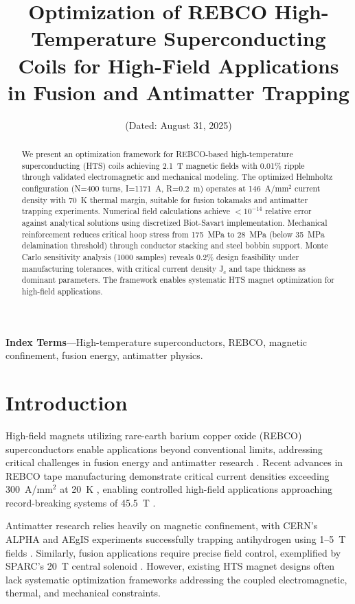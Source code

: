 \documentclass[10pt,twocolumn]{article}
\title{\Large\bfseries Optimization of REBCO High-Temperature Superconducting Coils for High-Field Applications in Fusion and Antimatter Trapping}
\author{\authorname}
\affil{Independent Researcher\thanks{Electronic address: \texttt{\authoremail}.}}
\date{(Dated: August 31, 2025)}
\begin{document}
\makeatletter
\renewcommand\@makefntext[1]{%
  \noindent\makebox[1.8em][l]{\@makefnmark}#1%
}
\makeatother

\maketitle

\begin{abstract}
We present an optimization framework for REBCO-based high-temperature superconducting (HTS) coils achieving 2.1~T magnetic fields with 0.01\% ripple through validated electromagnetic and mechanical modeling. The optimized Helmholtz configuration (N=400 turns, I=1171~A, R=0.2~m) operates at 146~A/mm$^2$ current density with 70~K thermal margin, suitable for fusion tokamaks and antimatter trapping experiments. Numerical field calculations achieve $<10^{-14}$ relative error against analytical solutions using discretized Biot-Savart implementation. Mechanical reinforcement reduces critical hoop stress from 175~MPa to 28~MPa (below 35~MPa delamination threshold) through conductor stacking and steel bobbin support. Monte Carlo sensitivity analysis (1000 samples) reveals 0.2\% design feasibility under manufacturing tolerances, with critical current density J$_c$ and tape thickness as dominant parameters. The framework enables systematic HTS magnet optimization for high-field applications.
\end{abstract}

\textbf{Index Terms}---High-temperature superconductors, REBCO, magnetic confinement, fusion energy, antimatter physics.

\section{Introduction}

High-field magnets utilizing rare-earth barium copper oxide (REBCO) superconductors enable applications beyond conventional limits, addressing critical challenges in fusion energy and antimatter research \cite{zhou2023}. Recent advances in REBCO tape manufacturing demonstrate critical current densities exceeding 300~A/mm$^2$ at 20~K \cite{superpower2022}, enabling controlled high-field applications approaching record-breaking systems of 45.5~T \cite{hahn2019}.

Antimatter research relies heavily on magnetic confinement, with CERN's ALPHA and AEgIS experiments successfully trapping antihydrogen using 1--5~T fields \cite{alpha2023,aegis2018}. Similarly, fusion applications require precise field control, exemplified by SPARC's 20~T central solenoid \cite{sparc2020}. However, existing HTS magnet designs often lack systematic optimization frameworks addressing the coupled electromagnetic, thermal, and mechanical constraints.
\end{document}
